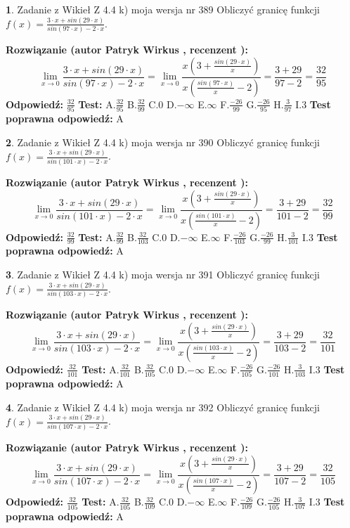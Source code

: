 \documentclass[12pt, a4paper]{article}
\theoremstyle{definition} %
\newtheorem{zad}{}
\newcommand{\zadStart}[1]{\begin{zad}#1\newline}
\newcommand{\zadStop}{\end{zad}}
\newcommand{\rozwStart}[2]{\noindent \textbf{Rozwiązanie (autor #1 , recenzent #2): }\newline}
\newcommand{\rozwStop}{\newline}
\newcommand{\odpStart}{\noindent \textbf{Odpowiedź:}\newline}
\newcommand{\odpStop}{\newline}
\newcommand{\testStart}{\noindent \textbf{Test:}\newline}
\newcommand{\testStop}{\newline}
\newcommand{\kluczStart}{\noindent \textbf{Test poprawna odpowiedź:}\newline}
\newcommand{\kluczStop}{\newline}
\begin{document}
\zadStart{Zadanie z Wikieł Z 4.4 k) moja wersja nr 389}
Obliczyć granicę funkcji $f(x)=\frac{3\cdot x +sin(29\cdot x)}{sin(97\cdot x) -2\cdot x}$.
\zadStop
\rozwStart{Patryk Wirkus}{}
$$\lim\limits_{x\to 0}\frac{3\cdot x +sin(29\cdot x)}{sin(97\cdot x) -2\cdot x}
=\lim\limits_{x\to 0}\frac{x(3+\frac{sin(29\cdot x)}{x})}{x(\frac{sin(97\cdot x)}{x}-2)}
=\frac{3+29}{97-2} = \frac{32}{95}$$
\rozwStop
\odpStart
$\frac{32}{95}$
\odpStop
\testStart
A.$\frac{32}{95}$
B.$\frac{32}{99}$
C.$0$
D.$-\infty$
E.$\infty$
F.$\frac{-26}{99}$
G.$\frac{-26}{95}$
H.$\frac{3}{97}$
I.$3$
\testStop
\kluczStart
A
\kluczStop



\zadStart{Zadanie z Wikieł Z 4.4 k) moja wersja nr 390}
Obliczyć granicę funkcji $f(x)=\frac{3\cdot x +sin(29\cdot x)}{sin(101\cdot x) -2\cdot x}$.
\zadStop
\rozwStart{Patryk Wirkus}{}
$$\lim\limits_{x\to 0}\frac{3\cdot x +sin(29\cdot x)}{sin(101\cdot x) -2\cdot x}
=\lim\limits_{x\to 0}\frac{x(3+\frac{sin(29\cdot x)}{x})}{x(\frac{sin(101\cdot x)}{x}-2)}
=\frac{3+29}{101-2} = \frac{32}{99}$$
\rozwStop
\odpStart
$\frac{32}{99}$
\odpStop
\testStart
A.$\frac{32}{99}$
B.$\frac{32}{103}$
C.$0$
D.$-\infty$
E.$\infty$
F.$\frac{-26}{103}$
G.$\frac{-26}{99}$
H.$\frac{3}{101}$
I.$3$
\testStop
\kluczStart
A
\kluczStop



\zadStart{Zadanie z Wikieł Z 4.4 k) moja wersja nr 391}
Obliczyć granicę funkcji $f(x)=\frac{3\cdot x +sin(29\cdot x)}{sin(103\cdot x) -2\cdot x}$.
\zadStop
\rozwStart{Patryk Wirkus}{}
$$\lim\limits_{x\to 0}\frac{3\cdot x +sin(29\cdot x)}{sin(103\cdot x) -2\cdot x}
=\lim\limits_{x\to 0}\frac{x(3+\frac{sin(29\cdot x)}{x})}{x(\frac{sin(103\cdot x)}{x}-2)}
=\frac{3+29}{103-2} = \frac{32}{101}$$
\rozwStop
\odpStart
$\frac{32}{101}$
\odpStop
\testStart
A.$\frac{32}{101}$
B.$\frac{32}{105}$
C.$0$
D.$-\infty$
E.$\infty$
F.$\frac{-26}{105}$
G.$\frac{-26}{101}$
H.$\frac{3}{103}$
I.$3$
\testStop
\kluczStart
A
\kluczStop



\zadStart{Zadanie z Wikieł Z 4.4 k) moja wersja nr 392}
Obliczyć granicę funkcji $f(x)=\frac{3\cdot x +sin(29\cdot x)}{sin(107\cdot x) -2\cdot x}$.
\zadStop
\rozwStart{Patryk Wirkus}{}
$$\lim\limits_{x\to 0}\frac{3\cdot x +sin(29\cdot x)}{sin(107\cdot x) -2\cdot x}
=\lim\limits_{x\to 0}\frac{x(3+\frac{sin(29\cdot x)}{x})}{x(\frac{sin(107\cdot x)}{x}-2)}
=\frac{3+29}{107-2} = \frac{32}{105}$$
\rozwStop
\odpStart
$\frac{32}{105}$
\odpStop
\testStart
A.$\frac{32}{105}$
B.$\frac{32}{109}$
C.$0$
D.$-\infty$
E.$\infty$
F.$\frac{-26}{109}$
G.$\frac{-26}{105}$
H.$\frac{3}{107}$
I.$3$
\testStop
\kluczStart
A
\kluczStop
\end{document}

